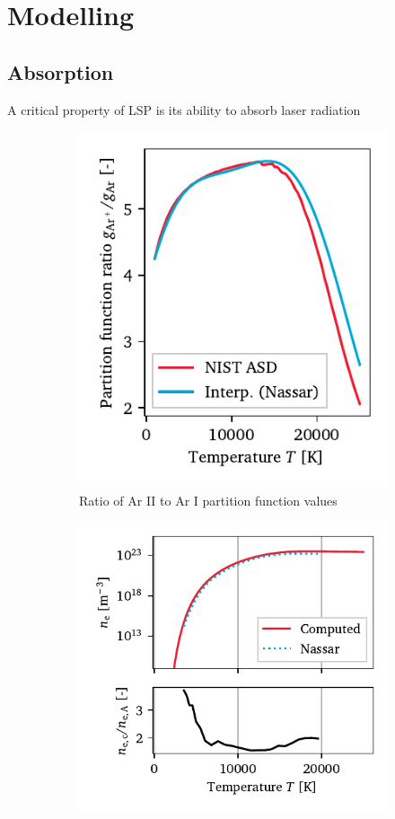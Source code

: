 \chapter{Modelling} \label{chp:models}
    \section{Absorption}
        A critical property of LSP is its ability to absorb laser radiation

        \begin{figure}[h]
            \centering
            \begin{subfigure}[t]{2.6in}
                \centering
                \includegraphics[]{assets/4 models/partition.pdf}
                \caption{Ratio of Ar II to Ar I partition function values}
                \label{fig:e_density_partition}
            \end{subfigure}
            \hfill
            \begin{subfigure}[t]{3.2in}
                \centering
                \includegraphics[]{assets/4 models/n_e.pdf}

\end{subfigure}
\end{figure}

